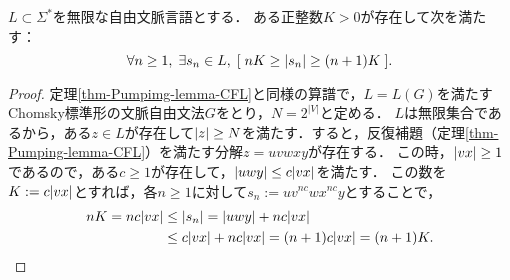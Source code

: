 \documentclass[uplatex, dvipdfmx]{jsreport}
\begin{document}
\begin{corollary}\label{cor-pumping-lemma}
    $L\subset\Sigma^*$を無限な自由文脈言語とする．
    ある正整数$K>0$が存在して次を満たす：
    \[\forall n\ge 1,\;\exists s_n\in L,\;[\;nK\ge\lvert s_n\rvert\ge(n+1)K\;].\]
\end{corollary}
\begin{proof}
    定理\ref{thm-Pumpimg-lemma-CFL}と同様の算譜で，$L=L(G)$を満たすChomsky標準形の文脈自由文法$G$をとり，$N=2^{|V|}$と定める．
    $L$は無限集合であるから，ある$z\in L$が存在して$\lvert z\rvert\ge N$を満たす．すると，反復補題（定理\ref{thm-Pumping-lemma-CFL}）を満たす分解$z=uvwxy$が存在する．
    この時，$\lvert vx\rvert\ge 1$であるので，ある$c\ge 1$が存在して，$\lvert uwy\rvert\le c\lvert vx\rvert$を満たす．
    この数を$K:=c\lvert vx\rvert$とすれば，各$n\ge 1$に対して$s_n:=uv^{nc}wx^{nc}y$とすることで，
    \begin{align*}
        nK= nc\lvert vx\rvert&\le \lvert s_n\rvert=\lvert uwy\rvert+nc\lvert vx\rvert\\
        &\le c\lvert vx\rvert+nc\lvert vx\rvert=(n+1)c\lvert vx\rvert=(n+1)K.
    \end{align*}
\end{proof}
\end{document}
